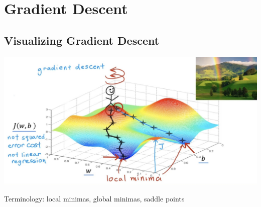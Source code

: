 \chapter{Gradient Descent}
\section{Visualizing Gradient Descent}
\includegraphics[width=\textwidth]{images/2.2_4}
\begin{notebox}
    Terminology: 
    local minimas, global minimas, saddle points
\end{notebox}


